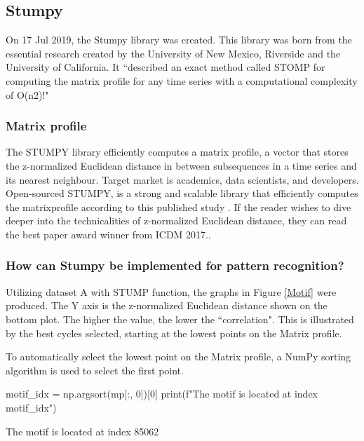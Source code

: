 \subsection{Stumpy}
\label{StumpySection}
On 17 Jul 2019, the Stumpy library was created. This library was born from the essential research created by the  University of New Mexico, Riverside and the University of California. It ``described an exact method called STOMP for computing the matrix profile for any time series with a computational complexity of O(n2)!" \cite{law2019stumpy} 

\subsubsection{Matrix profile} 
The STUMPY library efficiently computes a matrix profile, a vector that stores the z-normalized Euclidean distance in between subsequences in a time series and its nearest neighbour. Target market is academics, data scientists, and developers. Open-sourced STUMPY, is a strong and scalable library that efficiently computes the matrixprofile according to this published study \cite{law2019stumpy}. If the reader wishes to dive deeper into the technicalities of z-normalized Euclidean distance, they can read the best paper award winner from ICDM 2017.\cite{zhu_imamura_nikovski_keogh_2017}.

\subsubsection{How can Stumpy be implemented for pattern recognition?}
Utilizing dataset A with STUMP function, the graphs in Figure \ref{Motif} were produced.
The Y axis is the z-normalized Euclidean distance shown on the bottom plot. The higher the value, the lower the ``correlation". This is illustrated by the best cycles selected, starting at the lowest points on the Matrix profile.

To automatically select the lowest point on the Matrix profile, a NumPy sorting algorithm is used to select the first point.

\begin{python}
motif_idx = np.argsort(mp[:, 0])[0]
print(f"The motif is located at index {motif_idx}")
\end{python}
The motif is located at index 85062

